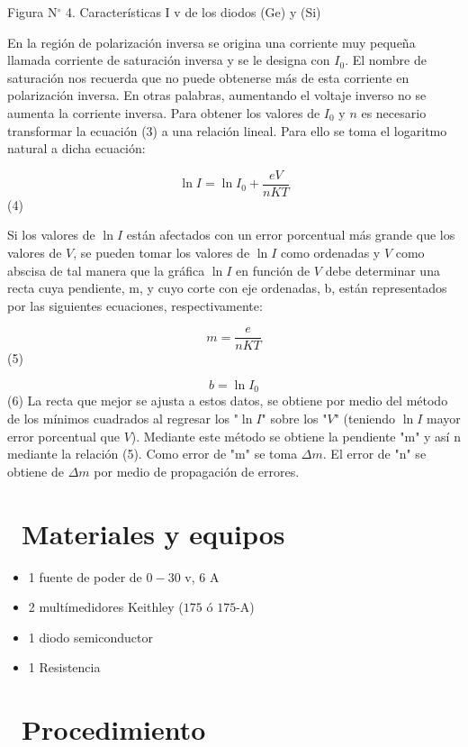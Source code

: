 \documentclass[11pt,a4paper]{article}
\newcommand{\iconotexto}[2]{\textcolor{cyanNeon}{\faIcon{#1}}~#2}
\begin{document}
Figura N$^{\circ}$ 4. Características I v de los diodos (Ge) y (Si)

En la región de polarización inversa se origina una corriente muy pequeña llamada corriente de saturación inversa y se le designa con $I_0$. El nombre de saturación nos recuerda que no puede obtenerse más de esta corriente en polarización inversa. En otras palabras, aumentando el voltaje inverso no se aumenta la corriente inversa. Para obtener los valores de $I_0$ y $n$ es necesario transformar la ecuación (3) a una relación lineal. Para ello se toma el logaritmo natural a dicha ecuación:

\[ \ln I = \ln I_0 + \frac{eV}{nKT} \] (4)

Si los valores de $\ln I$ están afectados con un error porcentual más grande que los valores de $V$, se pueden tomar los valores de $\ln I$ como ordenadas y $V$ como abscisa de tal manera que la gráfica $\ln I$ en función de $V$ debe determinar una recta cuya pendiente, m, y cuyo corte con eje ordenadas, b, están representados por las siguientes ecuaciones, respectivamente:

\[ m = \frac{e}{nKT} \] (5)

\[ b = \ln I_0 \] (6) La recta que mejor se ajusta a estos datos, se obtiene por medio del método de los mínimos cuadrados al regresar los "$\ln I$" sobre los "$V$" (teniendo $\ln I$ mayor error porcentual que $V$). Mediante este método se obtiene la pendiente "m" y así n mediante la relación (5). Como error de "m" se toma $\Delta m$. El error de "n" se obtiene de $\Delta m$ por medio de propagación de errores.

\section{\iconotexto{box-open}{Materiales y equipos}}

\begin{itemize}[leftmargin=1.4em,itemsep=2pt,topsep=3pt]
  \item 1 fuente de poder de $0 - 30$ v, $6$ A
  \item 2 multímedidores Keithley ($175$ ó $175$-A)
  \item 1 diodo semiconductor
  \item 1 Resistencia
\end{itemize}

\section{\iconotexto{list-ol}{Procedimiento}}
\end{document}

